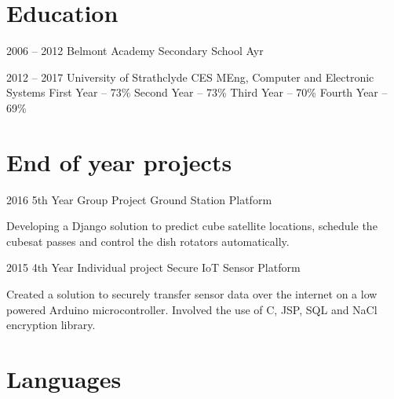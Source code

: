 \documentclass{tccv}
\begin{document}

\section{Education}

\begin{school}

\item{2006 -- 2012}
     {Belmont Academy}
     {Secondary School}
     {Ayr}

\end{school}
\begin{uni}

\item{2012 -- 2017}
     {University of Strathclyde}
     {CES MEng, Computer and Electronic Systems}
     {First Year -- 73\%}
     {Second Year -- 73\%}
     {Third Year -- 70\%}
     {Fourth Year -- 69\%}
\end{uni}

\section{End of year projects}

\begin{yearlist}

\item{2016}
     {5th Year Group Project}
     {Ground Station Platform}
\end{yearlist}

Developing a Django solution to predict cube satellite locations, schedule the cubesat passes and control the dish rotators automatically. 
\\ 

\begin{yearlist}
\item{2015}
     {4th Year Individual project}
     {Secure IoT Sensor Platform}
\end{yearlist}

Created a solution to securely transfer sensor data over the internet on a low powered Arduino microcontroller. Involved the use of C, JSP, SQL and NaCl encryption library.

\section{Languages}
\end{document}
